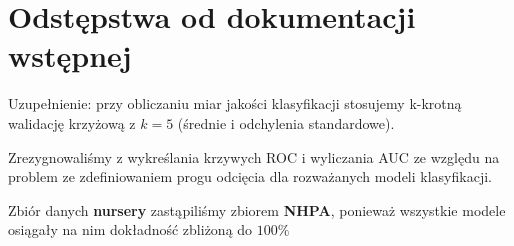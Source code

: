 \documentclass{article}
\begin{document}
\section{Odstępstwa od dokumentacji wstępnej}

Uzupełnienie: przy obliczaniu miar jakości klasyfikacji stosujemy k-krotną walidację krzyżową z $k=5$ (średnie i odchylenia standardowe).

Zrezygnowaliśmy z wykreślania krzywych ROC i wyliczania AUC ze względu na problem ze zdefiniowaniem progu odcięcia dla rozważanych
modeli klasyfikacji.

Zbiór danych \textbf{nursery} zastąpiliśmy zbiorem \textbf{NHPA}, ponieważ wszystkie modele osiągały na nim dokładność zbliżoną do $100\%$
\end{document}
